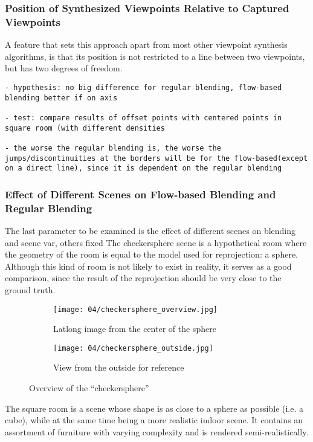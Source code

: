 \subsubsection{Position of Synthesized Viewpoints Relative to Captured Viewpoints}
A feature that sets this approach apart from most other viewpoint synthesis algorithms, is that its position is not restricted to a line between two viewpoints, but has two degrees of freedom. 
\begin{verbatim}
- hypothesis: no big difference for regular blending, flow-based blending better if on axis

- test: compare results of offset points with centered points in square room (with different densities

- the worse the regular blending is, the worse the jumps/discontinuities at the borders will be for the flow-based(except on a direct line), since it is dependent on the regular blending
\end{verbatim}

\subsubsection{Effect of Different Scenes on Flow-based Blending and Regular Blending}
The last parameter to be examined is the effect of different scenes on 
blending and scene var, others fixed
The checkersphere scene is a hypothetical room where the geometry of the room is equal to the model used for reprojection: a sphere. Although this kind of room is not likely to exist in reality, it serves as a good comparison, since the result of the reprojection should be very close to the ground truth.

\begin{figure}
\centering
    \hfill
    \begin{subfigure}[t]{0.7\textwidth}
            \centering
            \texttt{[image: 04/checkersphere\_overview.jpg]}
            \caption{Latlong image from the center of the sphere}
    \end{subfigure}%
    \hfill
    \begin{subfigure}[t]{0.3\textwidth}
            \centering
            \texttt{[image: 04/checkersphere\_outside.jpg]}
            \caption{View from the outside for reference}
    \end{subfigure}
    \hfill
  \caption{Overview of the ``checkersphere''}
\end{figure}


The square room is a scene whose shape is as close to a sphere as possible (i.e. a cube), while at the same time being a more realistic indoor scene. It contains an assortment of furniture with varying complexity and is rendered semi-realistically.

